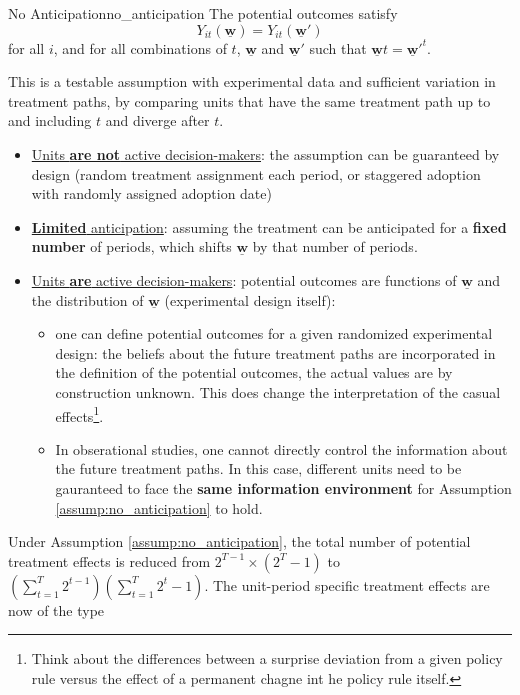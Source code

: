 \documentclass[twoside]{article}
\begin{document}
\begin{assumption}{No Anticipation}{no_anticipation}
    The potential outcomes satisfy $$ Y_{it}\left(\underline{\mathbf{w}}\right) = Y_{it}\left(\underline{\mathbf{w}}'\right)$$ for all $i$, and for all combinations of $t$, $\underline{\mathbf{w}}$ and $\underline{\mathbf{w}}'$ such that $\underline{\mathbf{w}}t=\underline{\mathbf{w}}'^{t}$. 
\end{assumption}
This is a testable assumption with experimental data and sufficient variation in treatment paths, by comparing units that have the same treatment path up to and including $t$ and diverge after $t$.
\begin{itemize}
    \item \underline{Units \textbf{are not} active decision-makers}: the assumption can be guaranteed by design (random treatment assignment each period, or staggered adoption with randomly assigned adoption date)
    \item \underline{\textbf{Limited} antici}p\underline{ation}: assuming the treatment can be anticipated for a \textbf{fixed number} of periods, which shifts $\underline{\mathbf{w}}$ by that number of periods.
    \item \underline{Units \textbf{are} active decision-makers}: potential outcomes are functions of $\underline{\mathbf{w}}$ and the distribution of $\underline{\mathbf{w}}$ (experimental design itself):
    \begin{itemize}
        \item one can define potential outcomes for a given randomized experimental design: the beliefs about the future treatment paths are incorporated in the definition of the potential outcomes, the actual values are by construction unknown. This does change the interpretation of the casual effects\footnote{Think about the differences between a surprise deviation from a given policy rule versus the effect of a permanent chagne int he policy rule itself.}.
        \item In obserational studies, one cannot directly control the information about the future treatment paths. In this case, different units need to be gauranteed to face the \textbf{same information environment} for Assumption \ref{assump:no_anticipation} to hold.
    \end{itemize}
\end{itemize}
Under Assumption \ref{assump:no_anticipation}, the total number of potential treatment effects is reduced from $2^{T-1}\times \left(2^T-1\right)$ to $\left(\sum^T_{t=1}2^{t-1}\right)\left(\sum^T_{t=1}2^t-1\right)$. The unit-period specific treatment effects are now of the type 
\end{document}
